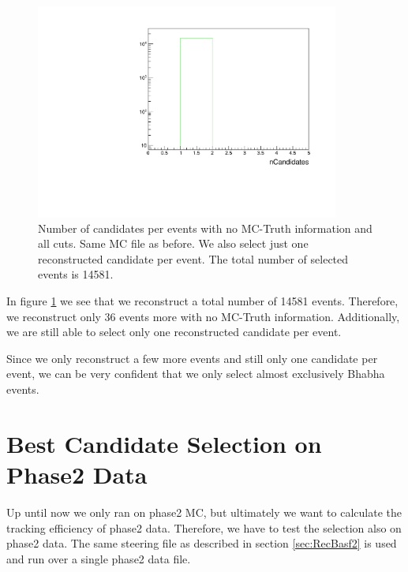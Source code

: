 \documentclass[a4paper,11pt,twosided,final,german,openbib,pdftex,listof=totoc,bibliography=totoc]{scrbook}
\begin{document}
\begin{figure}[h!]
	\centering
	\includegraphics[width=10cm]{Cuts/nCandNoMCInfo.pdf}
	\caption[Number Of Candidates Per Event With No MC-Truth Info (All Cuts)]{Number of candidates per events with no MC-Truth information and all cuts. Same MC file as before. We also select just one reconstructed candidate per event. The total number of selected events is 14581.}
	\label{fig:nCandNoMCInfo}
\end{figure}

In figure \ref{fig:nCandNoMCInfo} we see that we reconstruct a total number of 14581 events. Therefore, we reconstruct only 36 events more with no MC-Truth information. Additionally, we are still able to select only one reconstructed candidate per event. 

Since we only reconstruct a few more events and still only one candidate per event, we can be very confident that we only select almost exclusively Bhabha events.

\section{Best Candidate Selection on Phase2 Data}
\label{sec:SelectingBhabhaData}

Up until now we only ran on phase2 MC, but ultimately we want to calculate the tracking efficiency of phase2 data. Therefore, we have to test the selection also on phase2 data. The same steering file as described in section \ref{sec:RecBasf2} is used and run over a single phase2 data file. 
\end{document}
